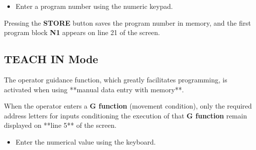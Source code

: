 \vspace{.5cm}

\begin{itemize}
    \item Enter a program number using the numeric keypad.
\end{itemize}

\begin{itemize}
\end{itemize}

\vspace{.5cm}

\begin{itemize}
\end{itemize}

Pressing the \textbf{STORE} button saves the program number in memory, and the first program block \textbf{N1} appears on line 21 of the screen.

\subsection{TEACH IN Mode}

The operator guidance function, which greatly facilitates programming, is activated when using **manual data entry with memory**.

When the operator enters a \textbf{G function} (movement condition), only the required address letters for inputs conditioning the execution of that \textbf{G function} remain displayed on **line 5** of the screen.

\procedure

\begin{itemize}
\end{itemize}

\vspace{.5cm}

\begin{itemize}
    \item Enter the numerical value using the keyboard.
\end{itemize}

\begin{itemize}
\end{itemize}

